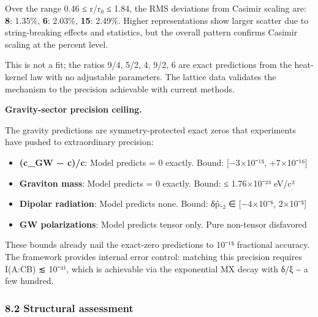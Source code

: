 \documentclass[
]{article}
\newcounter{none} %
\providecommand{\tightlist}{%
  \setlength{\itemsep}{0pt}\setlength{\parskip}{0pt}}
\begin{document}
Over the range 0.46 ≤ r/r₀ ≤ 1.84, the RMS deviations from Casimir
scaling are: \textbf{8}: 1.35\%, \textbf{6}: 2.03\%, \textbf{15}:
2.49\%. Higher representations show larger scatter due to
string-breaking effects and statistics, but the overall pattern confirms
Casimir scaling at the percent level.

This is not a fit; the ratios 9/4, 5/2, 4, 9/2, 6 are exact predictions
from the heat-kernel law with no adjustable parameters. The lattice data
validates the mechanism to the precision achievable with current
methods.

\textbf{Gravity-sector precision ceiling.}

The gravity predictions are symmetry-protected exact zeros that
experiments have pushed to extraordinary precision:

\begin{itemize}
\tightlist
\item
  \textbf{(c\_GW − c)/c}: Model predicts = 0 exactly. Bound:
  {[}−3×10⁻¹⁵, +7×10⁻¹⁶{]}
\item
  \textbf{Graviton mass}: Model predicts = 0 exactly. Bound: ≤
  1.76×10⁻²³ eV/c²
\item
  \textbf{Dipolar radiation}: Model predicts none. Bound: δp̂₋₂ ∈
  {[}−4×10⁻⁶, 2×10⁻⁵{]}
\item
  \textbf{GW polarizations}: Model predicts tensor only. Pure non-tensor
  disfavored
\end{itemize}

These bounds already nail the exact-zero predictions to 10⁻¹⁵ fractional
accuracy. The framework provides internal error control: matching this
precision requires I(A:C\textbar B) ≲ 10⁻³¹, which is achievable via the
exponential MX decay with δ/ξ \textasciitilde{} a few hundred.

\subsubsection{8.2 Structural assessment}\label{structural-assessment}
\end{document}
